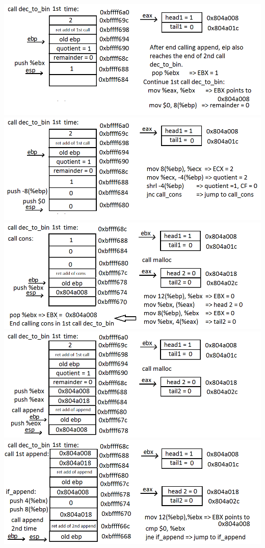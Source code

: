 \documentclass{article}
\begin{document}
\begin{center}
\includegraphics[scale=0.5]{stack11.png} \\
\includegraphics[scale=0.5]{stack12.png}\\
\includegraphics[scale=0.5]{stack13.png} \\
\includegraphics[scale=0.5]{stack14.png}\\
\includegraphics[scale=0.5]{stack15.png} \\

\end{center}
\end{document}

